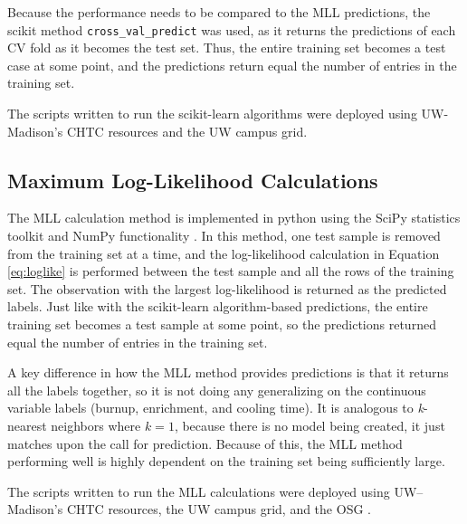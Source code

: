 Because the performance needs to be compared to the \gls{MLL} predictions, the
scikit method \texttt{cross\_val\_predict} was used, as it returns the
predictions of each \gls{CV} fold as it becomes the test set. Thus, the entire
training set becomes a test case at some point, and the predictions return
equal the number of entries in the training set.

The scripts written to run the scikit-learn algorithms were deployed using
\gls{UW}-Madison's \gls{CHTC} resources and the \gls{UW} campus grid. 

\subsection{Maximum Log-Likelihood Calculations}

The \gls{MLL} calculation method is implemented in python using the SciPy
statistics toolkit and NumPy functionality \cite{scipy, numpy}. In this method,
one test sample is removed from the training set at a time, and the
log-likelihood calculation in Equation \ref{eq:loglike} is performed between
the test sample and all the rows of the training set.  The observation with the
largest log-likelihood is returned as the predicted labels. Just like with the
scikit-learn algorithm-based predictions, the entire training set becomes a
test sample at some point, so the predictions returned equal the number of
entries in the training set.

A key difference in how the \gls{MLL} method provides predictions is that it
returns all the labels together, so it is not doing any generalizing on the
continuous variable labels (burnup, enrichment, and cooling time). It is
analogous to \textit{k}-nearest neighbors where $k = 1$, because there is no
model being created, it just matches upon the call for prediction. Because of
this, the \gls{MLL} method performing well is highly dependent on the training
set being sufficiently large. 

The scripts written to run the \gls{MLL} calculations were deployed using
\gls{UW}--Madison's \gls{CHTC} resources, the \gls{UW} campus grid, and the 
\gls{OSG} \cite{osg07, osg09}. 
